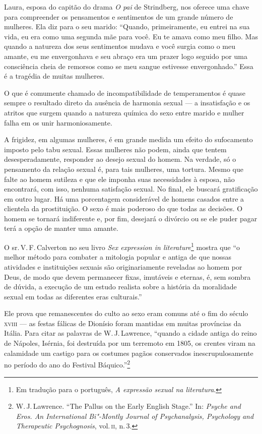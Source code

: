 Laura, esposa do capitão do drama \textit{O pai} de Strindberg, nos
oferece uma chave para compreender os pensamentos e sentimentos de um
grande número de mulheres. Ela diz para o seu marido: ``Quando, primeiramente, eu entrei na sua vida, eu era como uma segunda mãe para você. Eu te amava como meu filho. Mas quando a natureza dos seus
sentimentos mudava e você surgia como o meu amante, eu me envergonhava
e seu abraço era um prazer logo seguido por uma consciência cheia de
remorsos como se meu sangue estivesse envergonhado.'' Essa é a tragédia de muitas mulheres.


O que é comumente chamado de incompatibilidade de temperamentos é quase
sempre o resultado direto da ausência de harmonia sexual --- a
insatisfação e os atritos que surgem quando a natureza química do sexo
entre marido e mulher falha em os unir harmoniosamente.\label{unir}

A frigidez, em algumas mulheres, é em grande medida um efeito do
sufocamento imposto pelo tabu sexual. Essas mulheres não podem,
ainda que tentem desesperadamente, responder ao desejo sexual do homem.
Na verdade, só o pensamento da relação sexual é, para tais mulheres, uma
tortura. Mesmo que falte ao homem sutileza e que ele imponha
suas necessidades à esposa, não encontrará, com isso, nenhuma satisfação sexual. No
final, ele buscará gratificação em outro lugar. Há uma porcentagem
considerável de homens casados entre a clientela da prostituição. O sexo
é mais poderoso do que todas as decisões. O homem se tornará indiferente
e, por fim, desejará o divórcio ou se ele puder pagar terá a opção de manter uma
amante.


O sr.\,V.\,F.\,Calverton no seu livro \textit{Sex expression in literature}\footnote{Em tradução para o português, \textit{A expressão sexual na literatura}.} mostra que ``o
melhor método para combater a mitologia popular e antiga de que nossas
atividades e instituições sexuais são originariamente reveladas ao homem por
Deus, de modo que devem permanecer fixas, imutáveis e eternas, é, sem
sombra de dúvida, a execução de um estudo realista sobre a história da
moralidade sexual em todas as diferentes eras culturais.''

Ele prova que remanescentes do culto ao sexo eram comuns até o fim do
século \textsc{xviii} --- as festas fálicas de Dionísio foram mantidas em muitas
províncias da Itália. Para citar as palavras de W.\,J.\,Lawrence, ``quando
a cidade antiga do reino de Nápoles, Isérnia, foi destruída por um
terremoto em 1805, os crentes viram na calamidade um castigo para os
costumes pagãos conservados inescrupulosamente no período do ano do
Festival Báquico.''\footnote{W.\,J.\,Lawrence. ``The Pallus on the Early
  English Stage.'' In: \textit{Psyche and Eros. An International Bi"-Montly
  Journal of Psychanalysis, Psychology and Therapeutic Psychognosis},
  vol.\,\textsc{ii}, n.\,3.}

